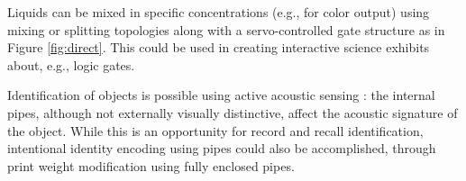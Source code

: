 Liquids can be mixed in specific concentrations (e.g., for color output) using mixing or splitting topologies along with a servo-controlled gate structure as in Figure \ref{fig:direct}.  This could be used in creating interactive science exhibits about, e.g., logic gates.

Identification of objects is possible using active acoustic sensing \cite{Ono-touchandactivate}: the internal pipes, although not externally visually distinctive, affect the acoustic signature of the object.  While this is an opportunity for record and recall identification, intentional identity encoding using pipes could also be accomplished, through print weight modification using fully enclosed pipes.